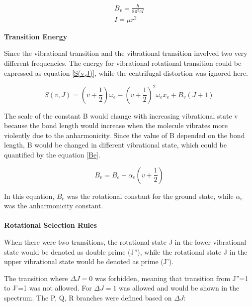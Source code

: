 \documentclass[twocolumn]{article} %
\begin{document}
\begin{subequations}
    \begin{align}
        B_v = \frac{h}{8\pi^2cI} \\
        I = \mu r^2
    \end{align}
\end{subequations}



\textbf{Transition Energy}

Since the vibrational transition and the vibrational transition involved two very different frequencies. The energy for vibrational rotational transition could be expressed as equation \ref{S(v,J)}, while the centrifugal distortion was ignored here. 

\begin{equation}
    S(v,J) = (v + \frac{1}{2}) \omega_e - (v + \frac{1}{2})^2\omega_ex_e + B_v(J + 1) 
    \label{S(v,J)}
\end{equation}

The scale of the constant B would change with increasing vibrational state v because the bond length would increase when the molecule vibrates more violently due to the anharmonicity. Since the value of B depended on the bond length, B would be changed in different vibrational state, which could be quantified by the equation \ref{Be}. 

\begin{equation}
    B_v = B_e - \alpha_e(v + \frac{1}{2}) \label{Be}
\end{equation}

In this equation, $B_e$ was the rotational constant for the ground state, while $\alpha_e$ was the anharmonicity constant. \\
\\



\textbf{Rotational Selection Rules}

When there were two transitions, the rotational state J in the lower vibrational state would be denoted as double prime (J''), while the rotational state J in the upper vibrational state would be denoted as prime (J'). 

The transition where $\Delta J=0$ was forbidden, meaning that transition from J''=1 to J'=1 was not allowed. For $\Delta J=1 $ was allowed and would be shown in the spectrum. The P, Q, R branches were defined based on $\Delta J$:

\end{document}
